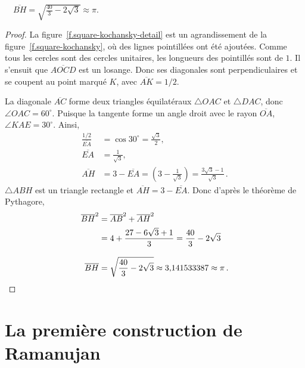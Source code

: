 \begin{theorem}
$\quad\overline{BH}=\sqrt{\displaystyle\frac{40}{3}-2\sqrt{3}}\approx \pi$.
\end{theorem}
\begin{proof}
La figure~\ref{f.square-kochansky-detail} est un agrandissement de la figure~\ref{f.square-kochansky}, où des lignes pointillées ont été ajoutées. Comme tous les cercles sont des cercles unitaires, les longueurs des pointillés sont de $1$. Il s'ensuit que $\overline{AOCD}$ est un losange. Donc ses diagonales sont perpendiculaires et se coupent au point marqué $K$, avec  $\overline{AK}=1/2$.



La diagonale $\overline{AC}$ forme deux triangles équilatéraux $\triangle OAC$ et $\triangle DAC$, donc $\angle OAC=60^\circ$. Puisque la tangente forme un angle droit avec le rayon $\overline{OA}$, $\angle KAE=30^\circ$. Ainsi,
\begin{align*}
\frac{1/2}{\overline{EA}}&=
\cos 30^\circ=\displaystyle\frac{\sqrt{3}}{2},\\
\overline{EA}&=\displaystyle\frac{1}{\sqrt{3}},\\
\overline{AH}&=3-\overline{EA}=\left(3-\displaystyle\frac{1}{\sqrt{3}}\right)
=\displaystyle\frac{3\sqrt{3}-1}{\sqrt{3}}\,.
\end{align*}
$\triangle ABH$ est un triangle rectangle et $\overline{AH}=3-\overline{EA}$. Donc d'après le théorème de Pythagore,
\begin{align*}
\overline{BH}^2&=\overline{AB}^2+\overline{AH}^2\\
&=4+\displaystyle\frac{27 -6\sqrt{3}+1}{3}=\frac{40}{3}-2\sqrt{3}\\
\overline{BH}&=\rule{0pt}{25pt}\sqrt{\displaystyle\frac{40}{3}-2\sqrt{3}}\approx \mbox{3,141533387}\approx \pi\,.\qedhere
\end{align*}
\end{proof}


\section{La première construction de Ramanujan}\label{s.square-ramanujan-first}


